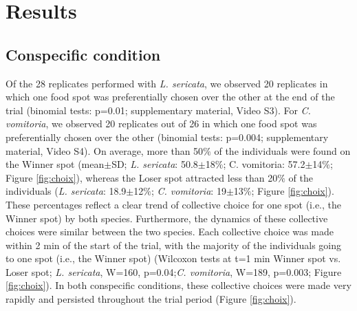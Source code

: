 	\section{Results}
		\subsection{Conspecific condition}
Of the 28 replicates performed with \textit{L. sericata}, we observed 20 replicates in which one food spot was preferentially chosen over the other at the end of the trial (binomial tests: p=0.01; supplementary material, Video S3). For \textit{C. vomitoria}, we observed 20 replicates out of 26 in which one food spot was preferentially chosen over the other (binomial tests: p=0.004; supplementary material, Video S4). On average, more than 50$\%$ of the individuals were found on the Winner spot (mean$\pm$SD; \textit{L. sericata}: 50.8$\pm$18$\%$; C. vomitoria: 57.2$\pm$14$\%$; Figure \ref{fig:choix}), whereas the Loser spot attracted less than 20$\%$ of the individuals (\textit{L. sericata}: 18.9$\pm$12$\%$; \textit{C. vomitoria}: 19$\pm$13$\%$; Figure \ref{fig:choix}). These percentages reflect a clear trend of collective choice for one spot (i.e., the Winner spot) by both species. Furthermore, the dynamics of these collective choices were similar between the two species. Each collective choice was made within 2 min of the start of the trial, with the majority of the individuals going to one spot (i.e., the Winner spot) (Wilcoxon tests at t=1 min Winner spot vs. Loser spot; \textit{L. sericata}, W=160, p=0.04;\textit{C. vomitoria}, W=189, p=0.003; Figure \ref{fig:choix}). In both conspecific conditions, these collective choices were made very rapidly and persisted throughout the trial period (Figure \ref{fig:choix}).


